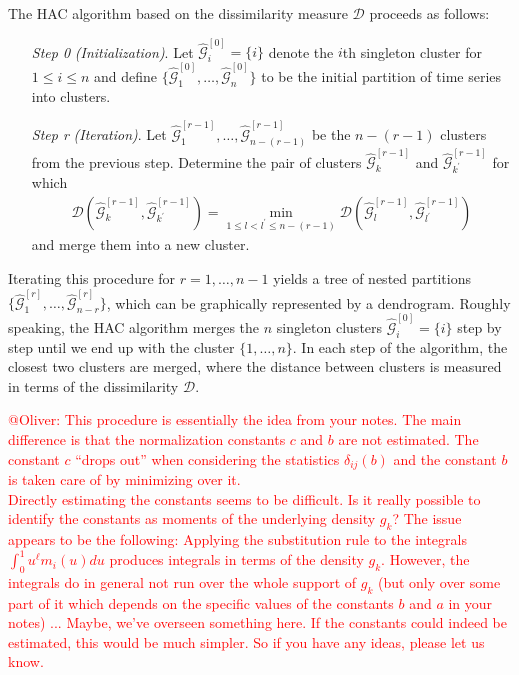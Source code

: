 \documentclass[a4paper,12pt]{article}
\numberwithin{equation}{section}
\begin{document}
The HAC algorithm based on the dissimilarity measure $\mathcal{D}$ proceeds as follows:
\begin{itemize}[leftmargin=1.4cm]

\item[\textit{Step 0}] \textit{(Initialization)}. Let $\hat{\mathcal{G}}_i^{[0]} = \{i\}$ denote the $i$th singleton cluster for $1 \leq i \leq n$ and define $\{\hat{\mathcal{G}}_1^{[0]}, \ldots, \hat{\mathcal{G}}_n^{[0]}\}$ to be the
initial partition of time series into clusters.

\item[\textit{Step r}] \textit{(Iteration)}. Let $\hat{\mathcal{G}}^{[r-1]}_1, \ldots, \hat{\mathcal{G}}^{[r-1]}_{n - (r-1)}$ be the $n-(r-1)$ clusters from the previous step. Determine the pair of clusters $\hat{\mathcal{G}}^{[r-1]}_k$ and $\hat{\mathcal{G}}^{[r-1]}_{k^\prime}$ for which 
\begin{align*}
\mathcal{D}(\hat{\mathcal{G}}^{[r-1]}_{k}, \hat{\mathcal{G}}^{[r-1]}_{k^\prime}) = \min_{1 \leq l < l^\prime \leq n- (r-1)} \mathcal{D}(\hat{\mathcal{G}}^{[r-1]}_{l}, \hat{\mathcal{G}}^{[r-1]}_{l^\prime})
\end{align*}
and merge them into a new cluster.

\end{itemize}
Iterating this procedure for $r = 1, \ldots, n-1$ yields a tree of nested partitions $\{\hat{\mathcal{G}}^{[r]}_1, \ldots, \hat{\mathcal{G}}^{[r]}_{n-r} \}$, which can be graphically represented by a dendrogram. Roughly speaking, the HAC algorithm merges the $n$ singleton clusters $\hat{\mathcal{G}}^{[0]}_i = \{i\}$ step by step until we end up with the cluster $\{1, \ldots, n\}$. In each step of the algorithm, the closest two clusters are merged, where the distance between clusters is measured in terms of the dissimilarity $\mathcal{D}$. %

\vspace{10pt}


\noindent \textcolor{red}{@Oliver: This procedure is essentially the idea from your notes. The main difference is that the normalization constants $c$ and $b$ are not estimated. The constant $c$ ``drops out'' when considering the statistics $\delta_{ij}(b)$ and the constant $b$ is taken care of by minimizing over it. \\ Directly estimating the constants seems to be difficult. Is it really possible to identify the constants as moments of the underlying density $g_k$? The issue appears to be the following: Applying the substitution rule to the integrals $\int_0^1 u^\ell m_i(u) du$ produces integrals in terms of the density $g_k$. However, the integrals do in general not run over the whole support of $g_k$ (but only over some part of it which depends on the specific values of the constants $b$ and $a$ in your notes) ... Maybe, we've overseen something here. If the constants could indeed be estimated, this would be much simpler. So if you have any ideas, please let us know.}
\end{document}
